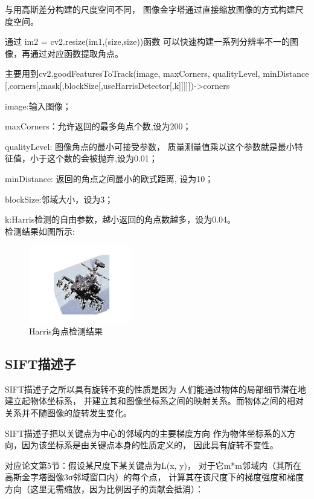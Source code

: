 \documentclass{article}
\begin{document}
    与用高斯差分构建的尺度空间不同，
    图像金字塔通过直接缩放图像的方式构建尺度空间。

    通过 im2 = cv2.resize(im1,(size,size))函数
    可以快速构建一系列分辨率不一的图像，再通过对应函数提取角点。

    主要用到cv2.goodFeaturesToTrack(image, maxCorners, qualityLevel, minDistance
    [,corners[,mask[,blockSize[,useHarrisDetector[,k]]]]])->corners

    image:输入图像；

    maxCorners：允许返回的最多角点个数,设为200；

    qualityLevel: 图像角点的最小可接受参数，
    质量测量值乘以这个参数就是最小特征值，小于这个数的会被抛弃,设为0.01；

    minDistance: 返回的角点之间最小的欧式距离, 设为10；

    blockSize:邻域大小，设为3；

    k:Harris检测的自由参数，越小返回的角点数越多，设为0.04。\\

    检测结果如图所示:

\begin{figure}[h]
\centering
\includegraphics[width=0.4\textwidth]{./result/findcorner}
\caption{Harris角点检测结果}
\end{figure}

\subsection{SIFT描述子}

    SIFT描述子之所以具有旋转不变的性质是因为
    人们能通过物体的局部细节潜在地建立起物体坐标系，
    并建立其和图像坐标系之间的映射关系。而物体之间的相对
    关系并不随图像的旋转发生变化。

    SIFT描述子把以关键点为中心的邻域内的主要梯度方向
    作为物体坐标系的X方向，因为该坐标系是由关键点本身的性质定义的，
    因此具有旋转不变性。

    对应论文第5节：假设某尺度下某关键点为L(x, y)，
    对于它m*m邻域内（其所在高斯金字塔图像3σ邻域窗口内）的每个点，
    计算其在该尺度下的梯度强度和梯度方向（这里无需缩放，因为比例因子的贡献会抵消）：
\end{document}

